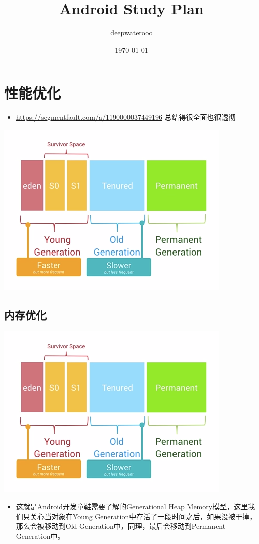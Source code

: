 \documentclass[9pt, b5paper]{article}
\author{deepwaterooo}
\date{\today}
\title{Android Study Plan}
\begin{document}
\maketitle
\tableofcontents


\section{性能优化}
\label{sec-1}
\begin{itemize}
\item \url{https://segmentfault.com/a/1190000037449196} 总结得很全面也很透彻
\end{itemize}

\includegraphics[width=.9\linewidth]{./pic/ulti.png}

\subsection{内存优化}
\label{sec-1-1}

\includegraphics[width=.9\linewidth]{./pic/heapmodel.png}
\begin{itemize}
\item 这就是Android开发童鞋需要了解的Generational Heap Memory模型，这里我们只关心当对象在Young Generation中存活了一段时间之后，如果没被干掉，那么会被移动到Old Generation中，同理，最后会移动到Permanent Generation中。
\end{itemize}
\end{document}
